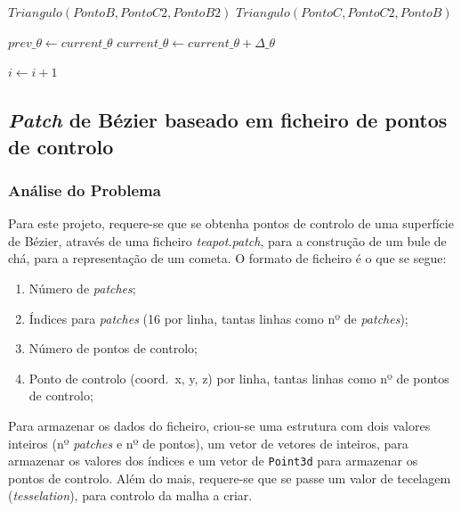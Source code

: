 \begin{landscape}
\begin{algorithm}
\begin{center}
\begin{algorithmic}[1]
\State$Triangulo(Ponto B, Ponto C2, Ponto B2)$
\State$Triangulo(Ponto C, Ponto C2, Ponto B)$



\State$prev\_\theta \gets current\_\theta$
\State$current\_\theta \gets current\_\theta + \Delta\_\theta$

\State$i \gets i + 1$


\EndWhile{}
\end{algorithmic}
\end{center}

\end{algorithm}


\end{landscape}
\restoregeometry{}

\subsection{\emph{Patch} de Bézier baseado em ficheiro de pontos de controlo}

\subsubsection{Análise do Problema}

Para este projeto, requere-se que se obtenha pontos de controlo de uma
superfície de Bézier, através de uma ficheiro \emph{teapot.patch}, para
a construção de um bule de chá, para a representação de um cometa. O formato de
ficheiro é o que se segue:
\begin{enumerate}
	\item Número de \emph{patches};
	\item Índices para \emph{patches} (16 por linha, tantas linhas como nº de
		\emph{patches});
	\item Número de pontos de controlo;
	\item Ponto de controlo (coord.\ x, y, z) por linha, tantas linhas como nº de
		pontos de controlo;
\end{enumerate}

Para armazenar os dados do ficheiro, criou-se uma estrutura com dois valores
inteiros (nº \emph{patches} e nº de pontos), um vetor de vetores de inteiros,
para armazenar os valores dos índices e um vetor de \texttt{Point3d} para
armazenar os pontos de controlo. Além do mais, requere-se que se passe um valor
de tecelagem (\emph{tesselation}), para controlo da malha a criar.

